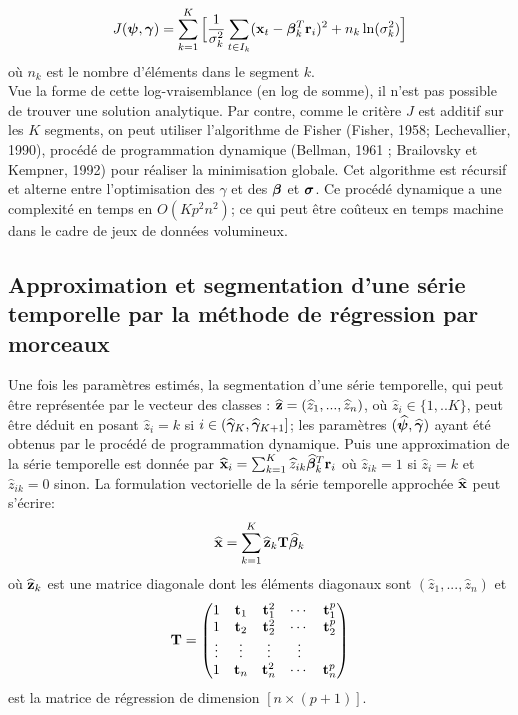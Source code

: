 \documentclass[12pt]{article}
\begin{document}
\begin{equation}
J(\boldsymbol{\psi},\boldsymbol{\gamma}) =  \sum_{k=1}^{K} \Big[ \frac{1}{\sigma^2_{k}} \sum_{t \in I_k} ({\mathbf{x}}_{t}-\boldsymbol{\beta}^{T}_{k}\mathbf{r}_{i})^2 + n_{k}\ln (\sigma^2_{k}) \Big]
\label{eq:Hyp3}
\end{equation}  
où $n_{k}$ est le nombre d'éléments dans le segment $k$.\\
Vue la forme de cette log-vraisemblance (en log de somme), il n'est pas possible de trouver une solution analytique. Par contre, comme le critère $J$ est additif sur les $K$ segments, on peut utiliser l'algorithme de Fisher (Fisher, 1958; Lechevallier, 1990), procédé de programmation dynamique (Bellman, 1961 ; Brailovsky et Kempner, 1992) pour réaliser la minimisation globale. Cet algorithme est récursif et alterne entre l'optimisation des $\gamma$ et des $\boldsymbol{\beta}$ et $\boldsymbol{\sigma}$.  Ce procédé dynamique a une complexité en temps en $O(Kp^2n^2)$; ce qui peut être coûteux en temps machine dans le cadre de jeux de données volumineux. 

\smallbreak
\subsection{Approximation et segmentation d'une série temporelle par la méthode de régression par morceaux}
\label{ssec: 2-3}
\smallbreak
Une fois les paramètres estimés, la segmentation d'une série temporelle, qui peut être représentée par le vecteur des classes :  
$\widehat{\mathbf{z}}=( \widehat{z}_1,...,\widehat{z}_n)$, où $\widehat{z}_i \in \{1,..K\}$, peut être déduit en posant $\widehat{z}_i = k$ si $i \in (\widehat{\boldsymbol{\gamma}}_{K},\widehat{\boldsymbol{\gamma}}_{K+1}]$; les paramètres  $(\widehat{\boldsymbol{\psi}},\widehat{\boldsymbol{\gamma}})$ ayant été obtenus par le procédé de programmation dynamique.
Puis une approximation de la série temporelle est donnée par $\widehat{{\mathbf{x}}}_{i}=\sum_{k=1}^{K} \widehat{z}_{ik}\widehat{\boldsymbol{\beta}}^{T}_{k}\mathbf{r}_{i}$ où $\widehat{z}_{ik}=1$ si $\widehat{z}_{i}=k$ et $\widehat{z}_{ik}=0$ sinon. La formulation vectorielle de la série temporelle approchée $\widehat{{\mathbf{x}}}$ peut s'écrire: 
\begin{equation}
\widehat{{\mathbf{x}}}=\sum_{k=1}^{K} \widehat{\mathbf{z}}_{k}\mathbf{T}\widehat{\boldsymbol{\beta}}_{k}
\label{eq:Hyp4}
\end{equation}  
où $ \widehat{\mathbf{z}}_{k}$ est une matrice diagonale dont les éléments diagonaux sont $( \widehat{z}_1,...,\widehat{z}_n)$ et 
$$
\mathbf{T}=\begin{pmatrix}
   1 & \mathbf{t}_{1} & \mathbf{t}^2_{1} & \cdots & \mathbf{t}^p_{1} \\
   1 & \mathbf{t}_{2} & \mathbf{t}^2_{2} & \cdots & \mathbf{t}^p_{2}  \\
   \vdots & \vdots &\vdots &\vdots\\
   1 & \mathbf{t}_{n} & \mathbf{t}^2_{n} & \cdots & \mathbf{t}^p_{n}  
\end{pmatrix}
$$
est la matrice de régression de dimension $[n\times(p+1)]$.
\end{document}
